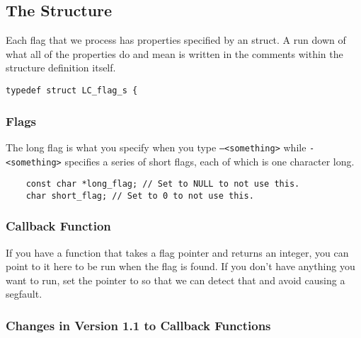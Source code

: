 \subsection{The  Structure}

Each flag that we process has properties specified by an  struct. A run down of what all of the properties do and mean is written in the comments within the structure definition itself.

\begin{verbatim}
typedef struct LC_flag_s {
\end{verbatim}

\subsubsection{Flags}

The long flag is what you specify when you type \texttt{--<something>} while \texttt{-<something>} specifies a series of short flags, each of which is one character long.

\begin{verbatim}
	const char *long_flag; // Set to NULL to not use this.
	char short_flag; // Set to 0 to not use this.
\end{verbatim}

\subsubsection{Callback Function}
\label{sec:callback-function}

If you have a function that takes a flag pointer and returns an integer, you can point to it here to be run when the flag is found. If you don't have anything you want to run, set the pointer to  so that we can detect that and avoid causing a segfault.\footnotemark


\subsubsection*{Changes in Version 1.1 to Callback Functions}

